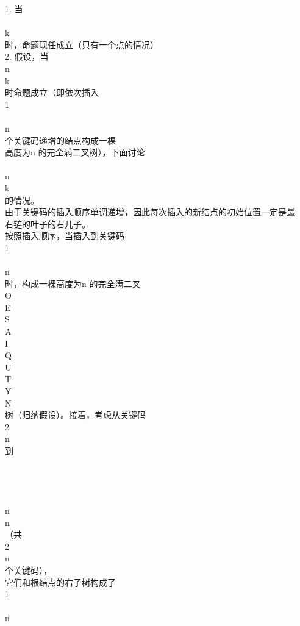 \begin{question}
\begin{solution}
1. 当\\
\\
k\\
时，命题现任成立（只有一个点的情况）\\
2. 假设，当\\
n\\
k \\
时命题成立（即依次插入\\
1 \\
\\
n\\
个关键码递增的结点构成一棵\\
高度为n 的完全满二叉树），下面讨论\\
\\
n\\
k\\
的情况。\\
由于关键码的插入顺序单调递增，因此每次插入的新结点的初始位置一定是最\\
右链的叶子的右儿子。\\
按照插入顺序，当插入到关键码\\
1 \\
\\
n\\
时，构成一棵高度为n 的完全满二叉\\
O\\
E\\
S\\
A\\
I\\
Q\\
U\\
T\\
Y\\
N\\
树（归纳假设）。接着，考虑从关键码\\
2 \\
n\\
到\\
\\
\\
\\
\\
n\\
n\\
（共\\
2 \\
n\\
个关键码），\\
它们和根结点的右子树构成了\\
1 \\
\\
n\\

\end{solution}
\end{question}
